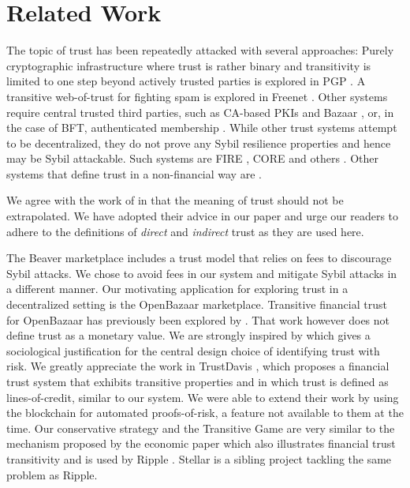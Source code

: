 \section{Related Work}
  The topic of trust has been repeatedly attacked with several approaches: Purely cryptographic infrastructure where trust
  is rather binary and transitivity is limited to one step beyond actively trusted parties is explored in PGP \cite{pgp}. A
  transitive web-of-trust for fighting spam is explored in Freenet \cite{freenet}. Other systems require central trusted
  third parties, such as CA-based PKIs \cite{pki} and Bazaar \cite{bazaar}, or, in the case of BFT, authenticated membership
  \cite{byzantine}. While other trust systems attempt to be decentralized, they do not prove any Sybil resilience properties
  and hence may be Sybil attackable. Such systems are FIRE \cite{fire}, CORE \cite{core} and others \cite{openrep,ghkkw,rk}.
  Other systems that define trust in a non-financial way are \cite{mui,beta,pace,vpc,sdt,wot,pathfinder}.

  We agree with the work of \cite{badtrust} in that the meaning of trust should not be extrapolated. We have adopted their
  advice in our paper and urge our readers to adhere to the definitions of \textit{direct} and \textit{indirect} trust as
  they are used here.

  The Beaver marketplace \cite{beaver} includes a trust model that relies on
  fees to discourage Sybil attacks. We chose to avoid fees in our system and mitigate Sybil attacks in a different manner.
  Our motivating application for exploring trust in a decentralized setting is the OpenBazaar marketplace. Transitive
  financial trust for OpenBazaar has previously been explored by \cite{dionyziz}. That work however does not define trust
  as a monetary value. We are strongly inspired by \cite{kmrs}
  which gives a sociological justification for the central design choice of identifying trust with
  risk. We greatly appreciate the work in TrustDavis \cite{davis}, which proposes a financial trust system that exhibits
  transitive properties and in which trust is defined as lines-of-credit, similar to our system. We were able to extend
  their work by using the blockchain for automated proofs-of-risk, a feature not available to them at the time. Our
  conservative strategy and the Transitive Game are very similar to the mechanism proposed by the economic paper
  \cite{iou} which also illustrates financial trust transitivity and is used by Ripple \cite{ripple}. Stellar \cite{stellar}
  is a sibling project tackling the same problem as Ripple.
